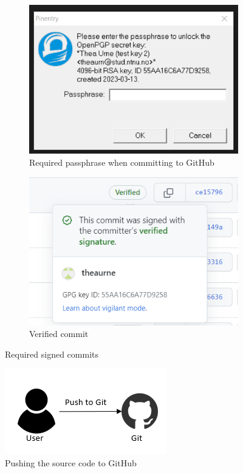 \begin{figure}[H]
  \centering
  \begin{subfigure}[H]{0.4\textwidth}
    \includegraphics[width=\textwidth]{Images/signedcommits.png}
    \caption{Required passphrase when committing to GitHub}
    \label{fig:image1}
  \end{subfigure}
  \hfill
  \begin{subfigure}[H]{0.4\textwidth}
    \includegraphics[width=\textwidth]{Images/verified-commit.png}
    \caption{Verified commit}
    \label{fig:image2}
  \end{subfigure}
  \caption{Required signed commits}
  \label{fig:overall}
\end{figure}

\vspace{2mm}
\begin{figure}[H]
    \centering
    \includegraphics[width=0.5\columnwidth]{Images/aws-piplin-1.png}
    \caption{Pushing the source code to GitHub}
    \label{fig: Pushing the source code to GitHub}
\end{figure}



